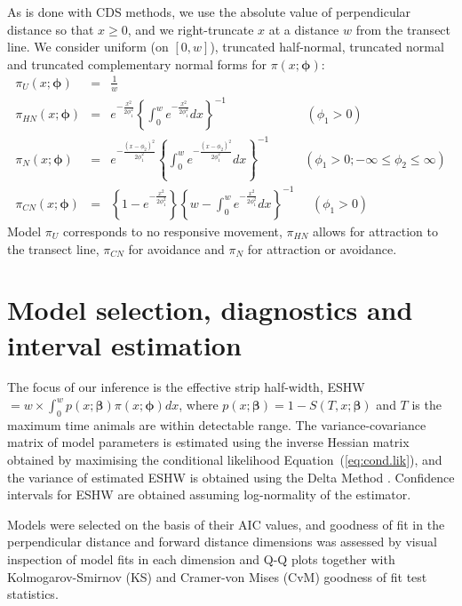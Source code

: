 \documentclass[useAMS,usenatbib,referee]{biom}
\begin{document}
As is done with CDS methods, we use the absolute value of perpendicular distance so that $x\geq 0$, and we right-truncate $x$ at a distance $w$ from the transect line. We consider uniform (on $[0,w]$), truncated half-normal, truncated normal and truncated complementary normal forms for $\pi(x;\boldsymbol{\phi})$:
\begin{eqnarray}
\pi_{U}(x;\boldsymbol{\phi})&=&\frac{1}{w}\nonumber \\
\pi_{HN}(x;\boldsymbol{\phi})&=&e^{-\frac{x^2}{2\phi_1^2}}\left\{\int_0^we^{-\frac{x^2}{2\phi_1^2}}dx\right\}^{-1}\;\;\;\;\;\;\;\;\;\;\;\;\;\;\;\;\;\;\;\;\;\;\;(\phi_1>0) \nonumber \\
\pi_{N}(x;\boldsymbol{\phi})&=&e^{-\frac{(x-\phi_2)^2}{2\phi_1^2}}\left\{\int_0^we^{-\frac{(x-\phi_2)^2}{2\phi_1^2}}dx\right\}^{-1}\;\;\;\;\;\;\;\;\;\;(\phi_1>0;-\infty\leq\phi_2\leq\infty) \nonumber \\
\pi_{CN}(x;\boldsymbol{\phi})&=&\left\{1-e^{-\frac{x^2}{2\phi_1^2}}\right\}\left\{w-\int_0^we^{-\frac{x^2}{2\phi_1^2}}dx\right\}^{-1}\;\;\;\;\;(\phi_1>0) \nonumber 
\end{eqnarray}
Model $\pi_{U}$ corresponds to no responsive movement,  $\pi_{HN}$ allows for attraction to the transect line, $\pi_{CN}$ for avoidance and $\pi_{N}$ for attraction or avoidance.

\section{Model selection, diagnostics and interval estimation}

The focus of our inference is the effective strip half-width, ESHW $=w\times\int_0^w p(x;\boldsymbol{\beta})\pi(x;\boldsymbol{\phi})dx$, where $p(x;\boldsymbol{\beta})=1-S(T,x;\boldsymbol{\beta})$ and $T$ is the maximum time animals are within detectable range. The variance-covariance matrix of model parameters is estimated using the inverse Hessian matrix obtained by maximising the conditional likelihood Equation~(\ref{eq:cond.lik}), and the variance of estimated ESHW is obtained using the Delta Method \citep[see][for example]{Oehlert:92}. Confidence intervals for ESHW are obtained assuming log-normality of the estimator.

Models were selected on the basis of their AIC values, and goodness of fit in the perpendicular distance and forward distance dimensions was assessed by visual inspection of model fits in each dimension and Q-Q plots together with Kolmogarov-Smirnov (KS) and Cramer-von Mises (CvM) goodness of fit test statistics.
\end{document}
